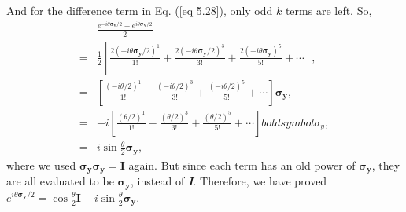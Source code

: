 \documentclass{article}
\newcommand{\bfit}[1]{\textit{\textbf{#1}}}
\begin{document}
And for the difference term in Eq. (\ref{eq 5.28}), only odd $k$ terms are left. So,
\begin{align*}\label{eq 5.32}
    &\frac{e^{-i\theta\boldsymbol{\sigma_y}/2}-e^{i\theta\boldsymbol{\sigma_y}/2}}{2}\\
    =&\frac{1}{2}\left[ \frac{2(-i\theta\boldsymbol{\sigma_y}/2)^1}{1!}+\frac{2(-i\theta\boldsymbol{\sigma_y}/2)^3}{3!}+\frac{2(-i\theta\boldsymbol{\sigma_y})^5}{5!}+\cdots \right], \\
    =&\left[\frac{(-i\theta/2)^1}{1!}+\frac{(-i\theta/2)^3}{3!}+\frac{(-i\theta/2)^5}{5!}+\cdots\right]\boldsymbol{\sigma_y},\\
    =&-i\left[\frac{(\theta/2)^1}{1!}-\frac{(\theta/2)^3}{3!}+\frac{(\theta/2)^5}{5!}+\cdots\right]boldsymbol{\sigma_y},\\
    =&i\sin{\frac{\theta}{2}}\boldsymbol{\sigma_y},\tag{5.32}
\end{align*}
where we used $\boldsymbol{\sigma_y\sigma_y}=\boldsymbol{I}$ again. But since each term has an old
power of $\boldsymbol{\sigma_y}$, they are all evaluated to be $\boldsymbol{\sigma_y}$, instead of \bfit{I}.
Therefore, we have proved $e^{i\theta\boldsymbol{\sigma_y}/2}=\cos{\frac{\theta}{2}\boldsymbol{I}}-i\sin{\frac{\theta}{2}}\boldsymbol{\sigma_y}$.
\end{document}

